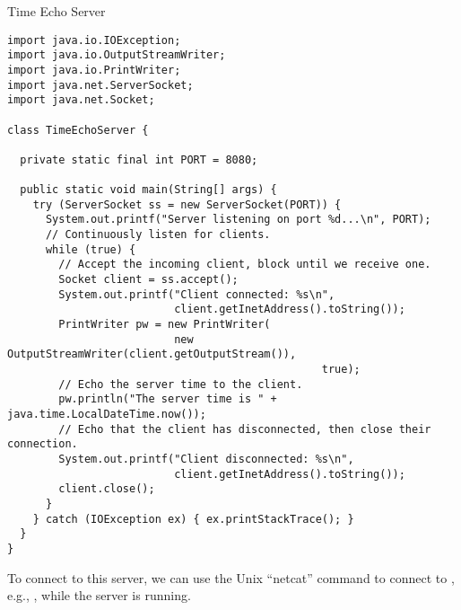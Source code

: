 \begin{cl}{Time Echo Server}
\begin{lstlisting}[language=MyJava]
import java.io.IOException;
import java.io.OutputStreamWriter;
import java.io.PrintWriter;
import java.net.ServerSocket;
import java.net.Socket;

class TimeEchoServer {

  private static final int PORT = 8080;

  public static void main(String[] args) {
    try (ServerSocket ss = new ServerSocket(PORT)) {
      System.out.printf("Server listening on port %d...\n", PORT);
      // Continuously listen for clients.
      while (true) {
        // Accept the incoming client, block until we receive one.
        Socket client = ss.accept();
        System.out.printf("Client connected: %s\n", 
                          client.getInetAddress().toString());
        PrintWriter pw = new PrintWriter(
                          new OutputStreamWriter(client.getOutputStream()), 
                                                 true);
        // Echo the server time to the client.
        pw.println("The server time is " + java.time.LocalDateTime.now());
        // Echo that the client has disconnected, then close their connection.
        System.out.printf("Client disconnected: %s\n", 
                          client.getInetAddress().toString());
        client.close();
      }
    } catch (IOException ex) { ex.printStackTrace(); }
  }
}
\end{lstlisting}
\end{cl}

To connect to this server, we can use the Unix  ``netcat'' command to connect to , e.g., , while the server is running.


